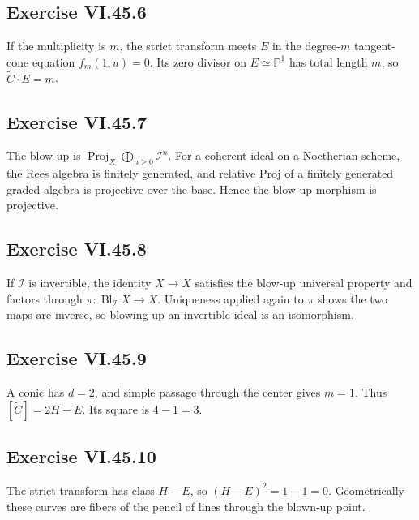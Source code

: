 \subsection*{Exercise VI.45.6}
\begin{solution}
If the multiplicity is \(m\), the strict transform meets \(E\) in the degree-\(m\) tangent-cone equation \(f_m(1,u)=0\).  Its zero divisor on \(E\simeq\mathbb P^1\) has total length \(m\), so \(\widetilde C\cdot E=m\).
\end{solution}

\subsection*{Exercise VI.45.7}
\begin{solution}
The blow-up is \(\operatorname{Proj}_X\bigoplus_{n\ge0}\mathcal I^n\).  For a coherent ideal on a Noetherian scheme, the Rees algebra is finitely generated, and relative Proj of a finitely generated graded algebra is projective over the base.  Hence the blow-up morphism is projective.
\end{solution}

\subsection*{Exercise VI.45.8}
\begin{solution}
If \(\mathcal I\) is invertible, the identity \(X\to X\) satisfies the blow-up universal property and factors through \(\pi:\operatorname{Bl}_{\mathcal I}X\to X\).  Uniqueness applied again to \(\pi\) shows the two maps are inverse, so blowing up an invertible ideal is an isomorphism.
\end{solution}

\subsection*{Exercise VI.45.9}
\begin{solution}
A conic has \(d=2\), and simple passage through the center gives \(m=1\).  Thus \([\widetilde C]=2H-E\).  Its square is \(4-1=3\).
\end{solution}

\subsection*{Exercise VI.45.10}
\begin{solution}
The strict transform has class \(H-E\), so \((H-E)^2=1-1=0\).  Geometrically these curves are fibers of the pencil of lines through the blown-up point.
\end{solution}

